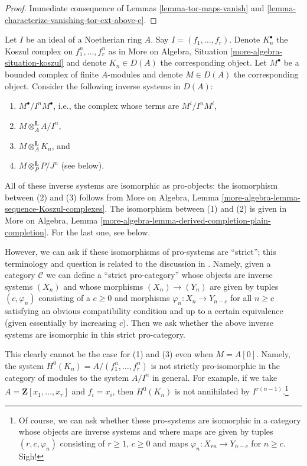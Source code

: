 \begin{proof}
Immediate consequence of Lemmas
\ref{lemma-tor-maps-vanish} and
\ref{lemma-characterize-vanishing-tor-ext-above-e}.
\end{proof}

\begin{remark}
\label{remark-strict-pro-isomorphism}
Let $I$ be an ideal of a Noetherian ring $A$. Say $I = (f_1, \ldots, f_r)$.
Denote $K_n^\bullet$ the Koszul complex on $f_1^n, \ldots, f_r^n$ as in
More on Algebra, Situation \ref{more-algebra-situation-koszul} and
denote $K_n \in D(A)$ the corresponding object.
Let $M^\bullet$ be a bounded complex of finite $A$-modules
and denote $M \in D(A)$ the corresponding object.
Consider the following inverse systems in $D(A)$:
\begin{enumerate}
\item $M^\bullet/I^nM^\bullet$, i.e., the complex whose terms are $M^i/I^nM^i$,
\item $M \otimes_A^\mathbf{L} A/I^n$,
\item $M \otimes_A^\mathbf{L} K_n$, and
\item $M \otimes_P^\mathbf{L} P/J^n$ (see below).
\end{enumerate}
All of these inverse systems are isomorphic as pro-objects:
the isomorphism between (2) and (3) follows from
More on Algebra, Lemma \ref{more-algebra-lemma-sequence-Koszul-complexes}.
The isomorphism between (1) and (2) is given in
More on Algebra, Lemma
\ref{more-algebra-lemma-derived-completion-plain-completion}.
For the last one, see below.

\medskip\noindent
However, we can ask if these isomorphisms of pro-systems are ``strict'';
this terminology and question is related to the discussion in
\cite[pages 61, 62]{quillenhomology}. Namely, given a category $\mathcal{C}$
we can define a ``strict pro-category'' whose objects are inverse systems
$(X_n)$ and whose morphisms $(X_n) \to (Y_n)$ are given by tuples
$(c, \varphi_n)$ consisting of a $c \geq 0$ and morphisms
$\varphi_n : X_n \to Y_{n - c}$ for all $n \geq c$ satisfying
an obvious compatibility condition and up to a certain equivalence
(given essentially by increasing $c$). Then we ask whether the above
inverse systems are isomorphic in this strict pro-category.

\medskip\noindent
This clearly cannot be the case for (1) and (3) even when $M = A[0]$.
Namely, the system $H^0(K_n) = A/(f_1^n, \ldots, f_r^n)$ is not strictly
pro-isomorphic in the category of modules to the system $A/I^n$ in general.
For example, if we take $A = \mathbf{Z}[x_1, \ldots, x_r]$ and $f_i = x_i$,
then $H^0(K_n)$ is not annihilated by $I^{r(n - 1)}$.\footnote{Of
course, we can ask whether these pro-systems are isomorphic in
a category whose objects are inverse systems and where maps are given
by tuples $(r, c, \varphi_n)$ consisting of $r \geq 1$, $c \geq 0$
and maps $\varphi_n : X_{rn} \to Y_{n - c}$ for $n \geq c$. Sigh!}


\end{remark}
